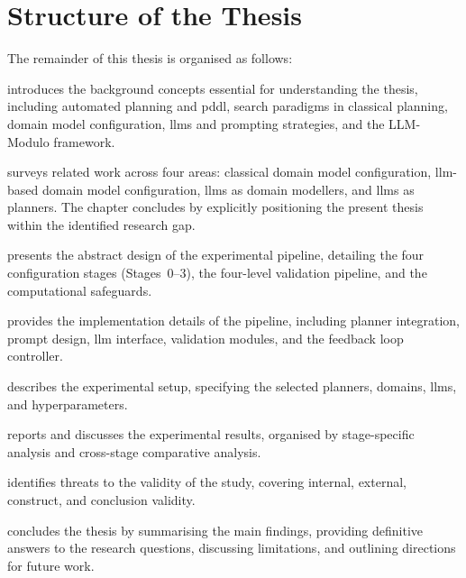 \section{Structure of the Thesis}
\label{sec:intro:structure}

The remainder of this thesis is organised as follows:

\begin{description}[style=nextline, leftmargin=2.5cm, labelwidth=2.2cm]
  \item[\Cref{ch:background}] introduces the background concepts essential for understanding the thesis, including automated planning and \gls{pddl}, search paradigms in classical planning, domain model configuration, \glspl{llm} and prompting strategies, and the LLM-Modulo framework.

  \item[\Cref{ch:related_work}] surveys related work across four areas: classical domain model configuration, \gls{llm}-based domain model configuration, \glspl{llm} as domain modellers, and \glspl{llm} as planners. The chapter concludes by explicitly positioning the present thesis within the identified research gap.

  \item[\Cref{ch:design}] presents the abstract design of the experimental pipeline, detailing the four configuration stages (Stages~0--3), the four-level validation pipeline, and the computational safeguards.

  \item[\Cref{ch:implementation}] provides the implementation details of the pipeline, including planner integration, prompt design, \gls{llm} interface, validation modules, and the feedback loop controller.

  \item[\Cref{ch:experimental_setup}] describes the experimental setup, specifying the selected planners, domains, \glspl{llm}, and hyperparameters.

  \item[\Cref{ch:results}] reports and discusses the experimental results, organised by stage-specific analysis and cross-stage comparative analysis.

  \item[\Cref{ch:threats}] identifies threats to the validity of the study, covering internal, external, construct, and conclusion validity.

  \item[\Cref{ch:conclusion}] concludes the thesis by summarising the main findings, providing definitive answers to the research questions, discussing limitations, and outlining directions for future work.
\end{description}
